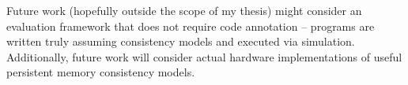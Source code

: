 Future work (hopefully outside the scope of my thesis) might consider an evaluation framework that does not require code annotation -- programs are written truly assuming consistency models and executed via simulation.
Additionally, future work will consider actual hardware implementations of useful persistent memory consistency models.
